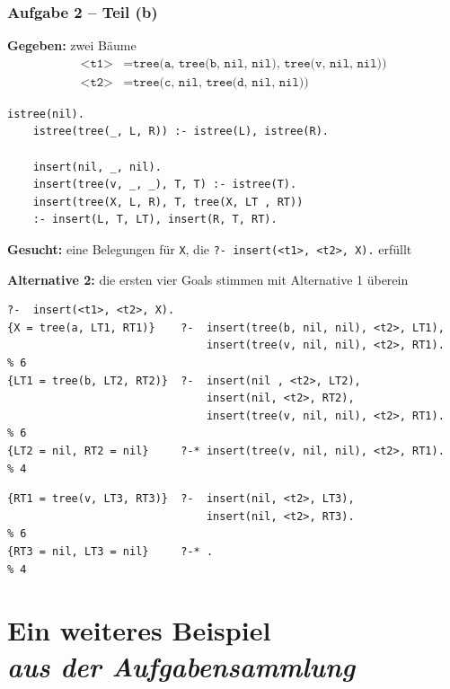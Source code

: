 \documentclass{beamer}
\begin{document}
\begin{frame}[fragile] \frametitle{Aufgabe 2 -- Teil (b)}
	\scriptsize
	\textbf{Gegeben:} zwei Bäume
	\begin{align*}
	\texttt{<t1>} &= \texttt{tree(a, tree(b, nil, nil), tree(v, nil, nil))} \\
	\texttt{<t2>} &= \texttt{tree(c, nil, tree(d, nil, nil))}
	\end{align*}
	\begin{lstlisting}[basicstyle=\ttfamily\tiny]
	istree(nil).
	istree(tree(_, L, R)) :- istree(L), istree(R).
	
	insert(nil, _, nil).
	insert(tree(v, _, _), T, T) :- istree(T).
	insert(tree(X, L, R), T, tree(X, LT , RT)) 
	:- insert(L, T, LT), insert(R, T, RT).
	\end{lstlisting}
	\textbf{Gesucht:} eine Belegungen für \texttt{X}, die \texttt{?- insert(<t1>, <t2>, X).} erfüllt

	
	\textbf{Alternative 2:} 
	{\tiny die ersten vier Goals stimmen mit Alternative 1 überein}
	\begin{lstlisting}[style=refutation, basicstyle=\ttfamily\tiny\color{cdgray}]
                           ?-  insert(<t1>, <t2>, X).
{X = tree(a, LT1, RT1)}    ?-  insert(tree(b, nil, nil), <t2>, LT1), 
                               insert(tree(v, nil, nil), <t2>, RT1).   % 6
{LT1 = tree(b, LT2, RT2)}  ?-  insert(nil , <t2>, LT2), 
                               insert(nil, <t2>, RT2), 
                               insert(tree(v, nil, nil), <t2>, RT1).   % 6
{LT2 = nil, RT2 = nil}     ?-* insert(tree(v, nil, nil), <t2>, RT1).   % 4
	\end{lstlisting} \vspace{-.5\baselineskip}
	\begin{lstlisting}[style=refutation, basicstyle=\ttfamily\tiny]
{RT1 = tree(v, LT3, RT3)}  ?-  insert(nil, <t2>, LT3),
                               insert(nil, <t2>, RT3).                 % 6
{RT3 = nil, LT3 = nil}     ?-* .                                       % 4
	\end{lstlisting}
	
\end{frame}


\section{Ein weiteres Beispiel \\ \itshape \normalsize aus der Aufgabensammlung}
\end{document}
